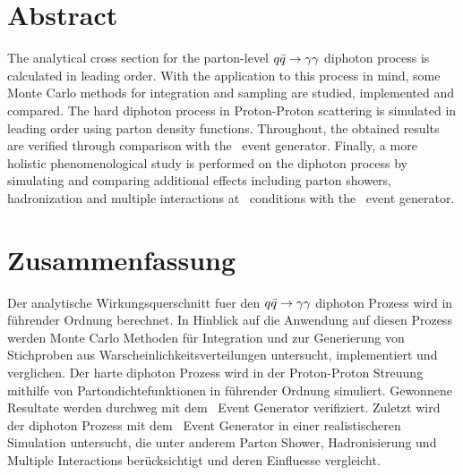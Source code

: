 \section*{Abstract}

The analytical cross section for the parton-level \(q\bar{q}\rightarrow\gamma\gamma\) diphoton
process is calculated in leading order. With the application to this
process in mind, some Monte Carlo methods for integration and sampling
are studied, implemented and compared. The hard diphoton process in
Proton-Proton scattering is simulated in leading order using parton
density functions. Throughout, the obtained results are verified
through comparison with the \sherpa\ event generator. Finally, a more
holistic phenomenological study is performed on the diphoton process
by simulating and comparing additional effects including parton
showers, hadronization and multiple interactions at \lhc\ conditions
with the \sherpa\ event generator.


\section*{Zusammenfassung}

Der analytische Wirkungsquerschnitt fuer den \(q\bar{q}\rightarrow\gamma\gamma\) diphoton
Prozess wird in f\"uhrender Ordnung berechnet. In Hinblick auf die
Anwendung auf diesen Prozess werden Monte Carlo Methoden f\"ur
Integration und zur Generierung von Stichproben aus
Warscheinlichkeitsverteilungen untersucht, implementiert und
verglichen. Der harte diphoton Prozess wird in der Proton-Proton
Streuung mithilfe von Partondichtefunktionen in f\"uhrender Ordnung
simuliert. Gewonnene Resultate werden durchweg mit dem \sherpa\ Event
Generator verifiziert. Zuletzt wird der diphoton Prozess mit dem
\sherpa\ Event Generator in einer realistischeren Simulation
untersucht, die unter anderem Parton Shower, Hadronisierung und
Multiple Interactions ber\"ucksichtigt und deren Einfluesse
vergleicht.

